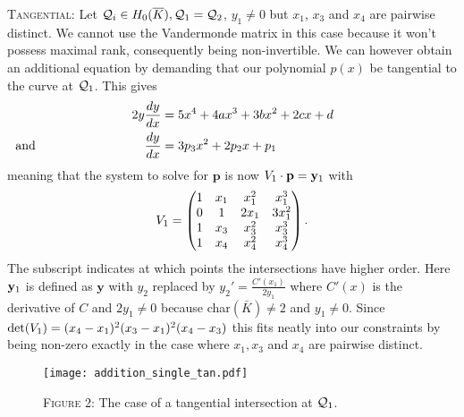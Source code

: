 \documentclass[english,11pt,a4paper]{article}
\begin{document}
\setcounter{case}{1}
\begin{case}
  {\scshape Tangential:} Let $\mathcal{Q}_i\in H_0(\overline K), \mathcal{Q}_1 = \mathcal{Q}_2$, $y_1 \neq 0$ but $x_1$, $x_3$ and $x_4$ are pairwise distinct. We cannot use the Vandermonde matrix in this case because it won't possess maximal rank, consequently being non-invertible. We can however obtain an additional equation by demanding that our polynomial $p(x)$ be tangential to the curve at $\mathcal{Q}_1$. This gives
  \begin{align*}
    2 y \frac{dy}{dx} &= 5  x^4 + 4 a x^3 + 3 b x^2 + 2 c x + d \\
    \rlap{\hspace{-37.5mm} and} \frac{dy}{dx} &= 3 p_3 x^2 + 2 p_2 x + p_1
  \end{align*}
  meaning that the system to solve for $\mathbf{p}$ is now $V_1 \cdot \mathbf{p} = \mathbf{y}_1$ with
  \begin{align*}V_1=
    \begin{pmatrix}
      1 & x_1 & x_1^2 & x_1^3\\
      0 & 1 & 2 x_1 & 3 x_1^2\\
      1 & x_3 & x_3^2 & x_3^3\\
      1 & x_4 & x_4^2 & x_4^3\\
    \end{pmatrix}.
  \end{align*}
  The subscript indicates at which points the intersections have higher order.
  Here $\mathbf{y}_1$ is defined as $\mathbf{y}$ with $y_2$ replaced by $y_2'=\frac{C'(x_1)}{2 y_1}$ where $C'(x)$ is the derivative of $C$ and $2y_1 \neq 0$ because char$(\bar K) \neq 2$ and $y_1\neq 0$. Since $\det(V_1) = (x_4-x_1)^2(x_3-x_1)^2(x_4-x_3)$ this fits neatly into our constraints by being non-zero exactly in the case where $x_1, x_3$ and $x_4$ are pairwise distinct.

\begin{figure}[ht]
  \fline
  \begin{center}
    \vspace{1mm}
    \texttt{[image: addition\_single\_tan.pdf]}

    {\scshape Figure 2}: The case of a tangential intersection at $\mathcal{Q}_1$.
  \end{center}
  \vspace{-1.5mm}
  \fline
\end{figure}


\end{case}
\end{document}
